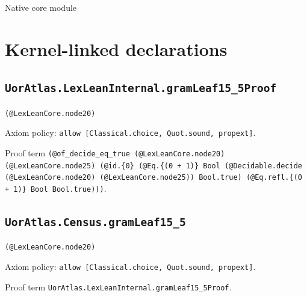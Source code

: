 \documentclass[11pt]{article}
\begin{document}
\begin{center}{\LARGE Native core module}\end{center}
\section*{Kernel-linked declarations}
\subsection*{\texttt{UorAtlas.LexLeanInternal.gramLeaf15\_5Proof}}
\noindent\texttt{(@LexLeanCore.node20)}\par
\noindent Axiom policy: \texttt{allow [Classical.choice, Quot.sound, propext]}.\par
\noindent Proof term \texttt{(@of\_decide\_eq\_true (@LexLeanCore.node20) (@LexLeanCore.node25) (@id.\{0\} (@Eq.\{(0 + 1)\} Bool (@Decidable.decide (@LexLeanCore.node20) (@LexLeanCore.node25)) Bool.true) (@Eq.refl.\{(0 + 1)\} Bool Bool.true)))}.\par
\subsection*{\texttt{UorAtlas.Census.gramLeaf15\_5}}
\noindent\texttt{(@LexLeanCore.node20)}\par
\noindent Axiom policy: \texttt{allow [Classical.choice, Quot.sound, propext]}.\par
\noindent Proof term \texttt{UorAtlas.LexLeanInternal.gramLeaf15\_5Proof}.\par
\end{document}
